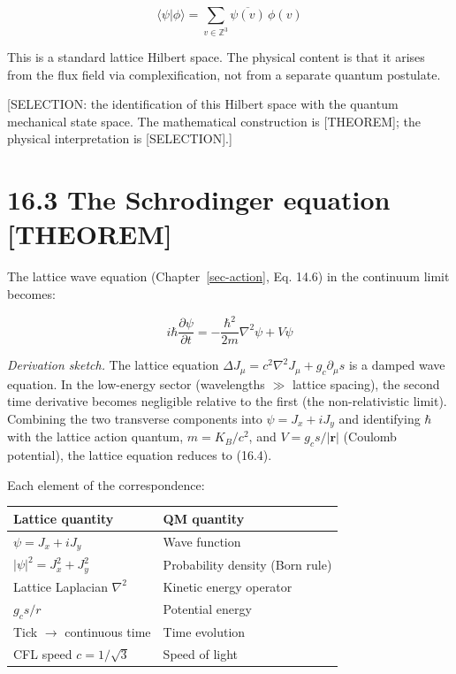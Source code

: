 \documentclass[
  11pt,
  letterpaper,
  twoside,
  openright]{book}
\begin{document}
\[
\langle \psi | \phi \rangle = \sum_{v \in \mathbb{Z}^3} \overline{\psi(v)} \, \phi(v)
\tag{16.3}
\]

This is a standard lattice Hilbert space. The physical content is that
it arises from the flux field via complexification, not from a separate
quantum postulate.

{[}SELECTION: the identification of this Hilbert space with the quantum
mechanical state space. The mathematical construction is {[}THEOREM{]};
the physical interpretation is {[}SELECTION{]}.{]}

\section{16.3 The Schrodinger equation
{[}THEOREM{]}}\label{the-schrodinger-equation-theorem}

The lattice wave equation (Chapter~\ref{sec-action}, Eq. 14.6) in the
continuum limit becomes:

\[
i\hbar \frac{\partial \psi}{\partial t} = -\frac{\hbar^2}{2m} \nabla^2 \psi + V\psi
\tag{16.4}
\]

\emph{Derivation sketch.} The lattice equation
\(\Delta J_\mu = c^2 \nabla^2 J_\mu + g_c \partial_\mu s\) is a damped
wave equation. In the low-energy sector (wavelengths \(\gg\) lattice
spacing), the second time derivative becomes negligible relative to the
first (the non-relativistic limit). Combining the two transverse
components into \(\psi = J_x + iJ_y\) and identifying \(\hbar\) with the
lattice action quantum, \(m = K_B/c^2\), and
\(V = g_c s / |\mathbf{r}|\) (Coulomb potential), the lattice equation
reduces to (16.4).

Each element of the correspondence:

\begin{longtable}[]{@{}ll@{}}
\toprule\noalign{}
Lattice quantity & QM quantity \\
\midrule\noalign{}
\endhead
\bottomrule\noalign{}
\endlastfoot
\(\psi = J_x + iJ_y\) & Wave function \\
\(|\psi|^2 = J_x^2 + J_y^2\) & Probability density (Born rule) \\
Lattice Laplacian \(\nabla^2\) & Kinetic energy operator \\
\(g_c s / r\) & Potential energy \\
Tick \(\to\) continuous time & Time evolution \\
CFL speed \(c = 1/\sqrt{3}\) & Speed of light \\
\end{longtable}
\end{document}
